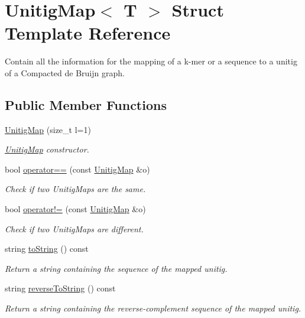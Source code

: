 \hypertarget{structUnitigMap}{}\section{Unitig\+Map$<$ T $>$ Struct Template Reference}
\label{structUnitigMap}


Contain all the information for the mapping of a k-\/mer or a sequence to a unitig of a Compacted de Bruijn graph.  


\subsection*{Public Member Functions}
\begin{DoxyCompactItemize}
\item 
\hyperlink{structUnitigMap_a92f76aa50f372b1f251850509958cc55}{Unitig\+Map} (size\+\_\+t l=1)
\begin{DoxyCompactList}\small\item\em \hyperlink{structUnitigMap}{Unitig\+Map} constructor. \end{DoxyCompactList}\item 
bool \hyperlink{structUnitigMap_af225db3c123c331f906de6cba96e4d07}{operator==} (const \hyperlink{structUnitigMap}{Unitig\+Map} \&o)
\begin{DoxyCompactList}\small\item\em Check if two Unitig\+Maps are the same. \end{DoxyCompactList}\item 
bool \hyperlink{structUnitigMap_af662157cd6f019189170270637dc9ea1}{operator!=} (const \hyperlink{structUnitigMap}{Unitig\+Map} \&o)
\begin{DoxyCompactList}\small\item\em Check if two Unitig\+Maps are different. \end{DoxyCompactList}\item 
string \hyperlink{structUnitigMap_a398ca4dd0e422ba08eaad9a11f15a3e3}{to\+String} () const
\begin{DoxyCompactList}\small\item\em Return a string containing the sequence of the mapped unitig. \end{DoxyCompactList}\item 
string \hyperlink{structUnitigMap_a3c9fb88f7da7250f361d972678d5a17e}{reverse\+To\+String} () const
\begin{DoxyCompactList}\small\item\em Return a string containing the reverse-\/complement sequence of the mapped unitig. \end{DoxyCompactList}\item 

\end{DoxyCompactItemize}
